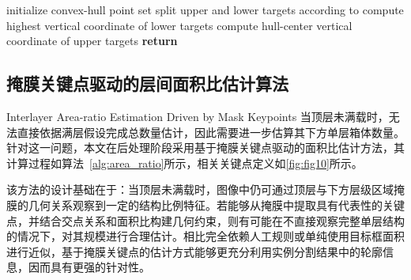 \begin{algorithm}[H]
  \caption{TopLayerFullLoadCheck}
  \label{alg:full_load}
  \footnotesize
  initialize convex-hull point set 
  split upper and lower targets according to 
  compute highest vertical coordinate  of lower targets
  compute hull-center vertical coordinate  of upper targets
  \textbf{return} 
\end{algorithm}

\subsection{掩膜关键点驱动的层间面积比估计算法}{Interlayer Area-ratio Estimation Driven by Mask Keypoints}
当顶层未满载时，无法直接依据满层假设完成总数量估计，因此需要进一步估算其下方单层箱体数量。针对这一问题，本文在后处理阶段采用基于掩膜关键点驱动的面积比估计方法，其计算过程如算法~\ref{alg:area_ratio}所示，相关关键点定义如\autoref{fig:fig10}所示。

该方法的设计基础在于：当顶层未满载时，图像中仍可通过顶层与下方层级区域掩膜的几何关系观察到一定的结构比例特征。若能够从掩膜中提取具有代表性的关键点，并结合交点关系和面积比构建几何约束，则有可能在不直接观察完整单层结构的情况下，对其规模进行合理估计。相比完全依赖人工规则或单纯使用目标框面积进行近似，基于掩膜关键点的估计方式能够更充分利用实例分割结果中的轮廓信息，因而具有更强的针对性。

